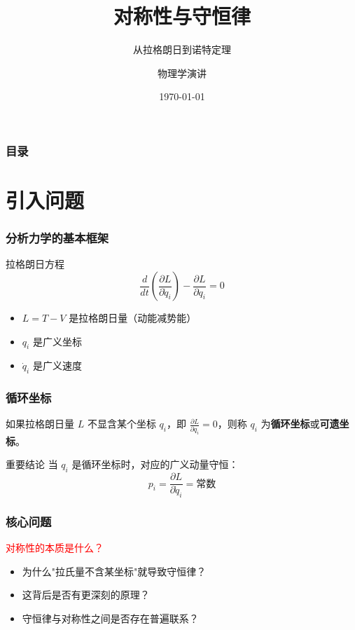 \documentclass[xcolor=dvipsnames]{ctexbeamer}
\title{对称性与守恒律}
\subtitle{从拉格朗日到诺特定理}
\author{物理学演讲}
\date{\today}
\begin{document}
\frame{\titlepage}

\begin{frame}
\frametitle{目录}
\tableofcontents
\end{frame}

\section{引入问题}

\begin{frame}
\frametitle{分析力学的基本框架}
\begin{block}{拉格朗日方程}
$$\frac{d}{dt}\left(\frac{\partial L}{\partial \dot{q}_i}\right) - \frac{\partial L}{\partial q_i} = 0$$
\end{block}

\pause

\begin{itemize}
\item $L = T - V$ 是拉格朗日量（动能减势能）
\item $q_i$ 是广义坐标
\item $\dot{q}_i$ 是广义速度
\end{itemize}
\end{frame}

\begin{frame}
\frametitle{循环坐标}
\begin{definition}
如果拉格朗日量 $L$ 不显含某个坐标 $q_i$，即 $\frac{\partial L}{\partial q_i} = 0$，则称 $q_i$ 为\textbf{循环坐标}或\textbf{可遗坐标}。
\end{definition}

\pause

\begin{block}{重要结论}
当 $q_i$ 是循环坐标时，对应的广义动量守恒：
$$p_i = \frac{\partial L}{\partial \dot{q}_i} = \text{常数}$$
\end{block}
\end{frame}

\begin{frame}
\frametitle{核心问题}
\begin{center}
\Large \textcolor{red}{对称性的本质是什么？}
\end{center}

\pause

\begin{itemize}
\item 为什么"拉氏量不含某坐标"就导致守恒律？
\pause
\item 这背后是否有更深刻的原理？
\pause
\item 守恒律与对称性之间是否存在普遍联系？
\end{itemize}
\end{frame}
\end{document}
